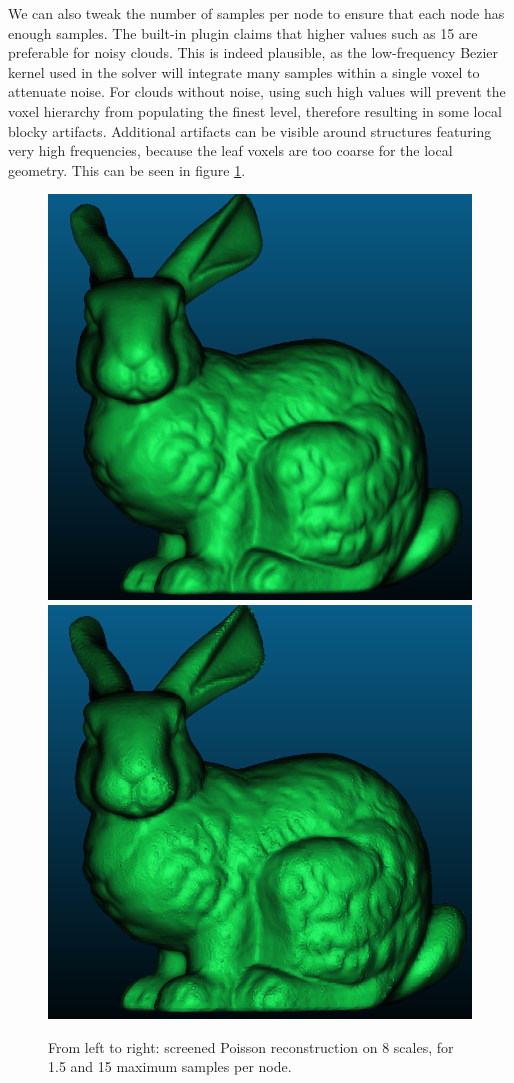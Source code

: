 \documentclass[a4paper]{article}
\begin{document}
We can also tweak the number of samples per node to ensure that each node has enough samples.
The built-in plugin claims that higher values such as 15 are preferable for noisy clouds.
This is indeed plausible, as the low-frequency Bezier kernel used in the solver will integrate
many samples within a single voxel to attenuate noise.
For clouds without noise, using such high values will prevent the voxel hierarchy from
populating the finest level, therefore resulting in some local blocky artifacts.
Additional artifacts can be visible around structures featuring very high frequencies,
because the leaf voxels are too coarse for the local geometry. This can be seen in figure \ref{fig:SPR_spn}.

\begin{figure}[ht]
    \centering
    \includegraphics[width=0.3\linewidth]{figures/n=08 .png}
    \includegraphics[width=0.3\linewidth]{figures/n=08_15_spn.png}
    \caption{From left to right: screened Poisson reconstruction on 8 scales, for 1.5 and 15 maximum samples per node.}
    \label{fig:SPR_spn}
\end{figure}
\end{document}
